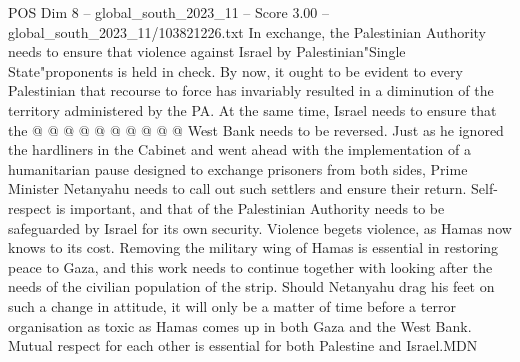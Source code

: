 \begin{textsample}{POS Dim 8 – global\_south\_2023\_11 – Score 3.00 – global\_south\_2023\_11/103821226.txt}
In exchange, the Palestinian Authority needs to ensure that violence against Israel by Palestinian"Single State"proponents is held in check.
By now, it ought to be evident to every Palestinian that recourse to force has invariably resulted in a diminution of the territory administered by the PA.
At the same time, Israel needs to ensure that the @ @ @ @ @ @ @ @ @ @ West Bank needs to be reversed.
Just as he ignored the hardliners in the Cabinet and went ahead with the implementation of a humanitarian pause designed to exchange prisoners from both sides, Prime Minister Netanyahu needs to call out such settlers and ensure their return.
Self-respect is important, and that of the Palestinian Authority needs to be safeguarded by Israel for its own security.
Violence begets violence, as Hamas now knows to its cost.
Removing the military wing of Hamas is essential in restoring peace to Gaza, and this work needs to continue together with looking after the needs of the civilian population of the strip.
Should Netanyahu drag his feet on such a change in attitude, it will only be a matter of time before a terror organisation as toxic as Hamas comes up in both Gaza and the West Bank.
Mutual respect for each other is essential for both Palestine and Israel.MDN

\end{textsample}
